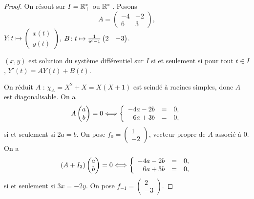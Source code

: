 \documentclass[12pt]{article}
\begin{document}
\begin{proof}
	On résout sur $I=\mathbb{R}_{+}^{*}$ ou $\mathbb{R}_{-}^{*}$. Posons 
	\begin{equation}
		A=\begin{pmatrix}
			-4&-2\\
			6&3
		\end{pmatrix},
	\end{equation}
	$Y\colon t\mapsto\begin{pmatrix}
		x(t)\\y(t)
	\end{pmatrix}$, $B\colon t\mapsto\frac{1}{\mathrm{e}^{t}-1}\begin{pmatrix}
		2&-3
	\end{pmatrix}$.

	$(x,y)$ est solution du système différentiel sur $I$ si et seulement si pour tout $t\in I$, $Y'(t)=AY(t)+B(t)$.

	On réduit $A$ : $\chi_{A}=X^{2}+X=X(X+1)$ est scindé à racines simples, donc $A$ est diagonalisable. On a 
	\begin{equation}
		A\begin{pmatrix}
			a\\b
		\end{pmatrix}=0\Longleftrightarrow 
		\left\lbrace
			\begin{array}[]{rcl}
				-4a-2b&=&0,\\
				6a+3b&=&0,
			\end{array}
		\right.
	\end{equation}
	si et seulement si $2a=b$. On pose $f_0=\begin{pmatrix}
		1\\-2
	\end{pmatrix}$, vecteur propre de $A$ associé à 0. On a 
	\begin{equation}
		(A+I_2)\begin{pmatrix}
			a\\b
		\end{pmatrix}=0\Longleftrightarrow
		\left\lbrace
			\begin{array}[]{rcl}
				-4a-2b &=&0,\\
				6a+3b &=&0,
			\end{array}
		\right.
	\end{equation}
	si et seulement si $3x=-2y$. On pose $f_{-1}=\begin{pmatrix}
		2\\-3
	\end{pmatrix}$.


\end{proof}
\end{document}
